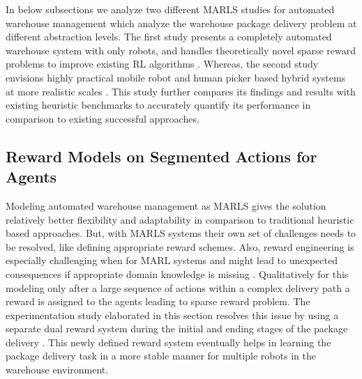\documentclass{article}
\begin{document}
In below subsections we analyze two different MARLS studies for automated warehouse management which analyze the warehouse package delivery problem at different abstraction levels.
The first study presents a completely automated warehouse system with only robots, and handles theoretically novel sparse reward problems to improve existing RL algorithms \cite{lee2022marl}.
Whereas, the second study envisions highly practical mobile robot and human picker based hybrid systems at more realistic scales \cite{krnjaic2022scalable}.
This study further compares its findings and results with existing heuristic benchmarks to accurately quantify its performance in comparison to existing successful approaches.


\subsection{Reward Models on Segmented Actions for Agents}


Modeling automated warehouse management as MARLS gives the solution relatively better flexibility and adaptability in comparison to traditional heuristic based approaches.
But, with MARLS systems their own set of challenges needs to be resolved, like defining appropriate reward schemes.
Also, reward engineering is especially challenging when for MARL systems and might lead to unexpected consequences if appropriate domain knowledge is missing \cite{cabi2019scaling}.
Qualitatively for this modeling only after a large sequence of actions within a complex delivery path a reward is assigned to the agents leading to sparse reward problem.
The experimentation study elaborated in this section resolves this issue by using a separate dual reward system during the initial and ending stages of the package delivery \cite{lee2022marl}.
This newly defined reward system eventually helps in learning the package delivery task in a more stable manner for multiple robots in the warehouse environment.
\end{document}
